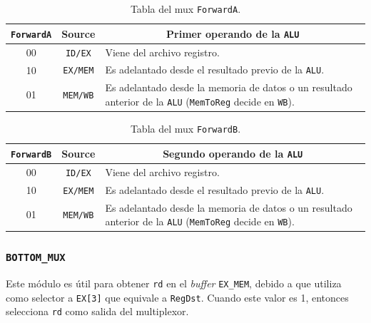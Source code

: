\documentclass[a4paper]{article}
\begin{document}
\begin{table}[H]
\centering
\begin{tabular}{|c|c|p{7.5cm}|}
\hline
\texttt{ForwardA} & \textbf{Source} & \multicolumn{1}{c|}{\textbf{Primer operando de la \texttt{ALU}}}                    \\ \hline
00 & \texttt{ID/EX}  & Viene del archivo registro.                        \\ \hline
10 & \texttt{EX/MEM} & Es adelantado desde el resultado previo de la \texttt{ALU}. \\ \hline
01                & \texttt{MEM/WB}          & Es adelantado desde la memoria de datos o un resultado anterior de la \texttt{ALU} (\texttt{MemToReg} decide en \texttt{WB}). \\ \hline
\end{tabular}
\caption{Tabla del mux \texttt{ForwardA}.}
\label{tab:forwardA-table}
\end{table}

\begin{table}[H]
\centering
\begin{tabular}{|c|c|p{7.5cm}|}
\hline
\texttt{ForwardB} & \textbf{Source} & \multicolumn{1}{c|}{\textbf{Segundo operando de la \texttt{ALU}}}                   \\ \hline
00 & \texttt{ID/EX}  & Viene del archivo registro.                        \\ \hline
10 & \texttt{EX/MEM} & Es adelantado desde el resultado previo de la \texttt{ALU}. \\ \hline
01                & \texttt{MEM/WB}          & Es adelantado desde la memoria de datos o un resultado anterior de la \texttt{ALU} (\texttt{MemToReg} decide en \texttt{WB}). \\ \hline
\end{tabular}
\caption{Tabla del mux \texttt{ForwardB}.}
\label{tab:forwardB-table}
\end{table}

\subsubsection{\texttt{BOTTOM\_MUX}} \label{sec:bottom}
Este módulo es útil para obtener \texttt{rd} en el \textit{buffer} \texttt{EX\_MEM}, debido a que utiliza como selector a \texttt{EX[3]} que equivale a \texttt{RegDst}. Cuando este valor es 1, entonces selecciona \texttt{rd} como salida del multiplexor.
%
\end{document}
